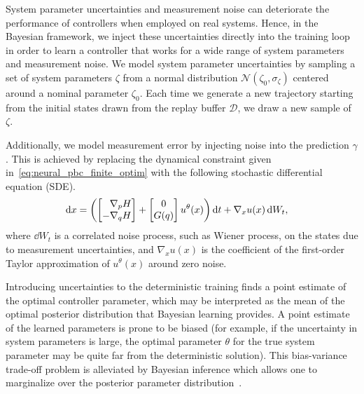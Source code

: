 

System parameter uncertainties and measurement noise can deteriorate the
performance of controllers when employed on real systems. 
%
Hence, in the Bayesian framework, we inject these uncertainties directly into
the training loop in order to learn a controller that works for a wide range of
system parameters and measurement noise.
%
We model system parameter uncertainties by sampling a set of system parameters
$\zeta$ from a normal distribution $\mathcal{N}(\zeta_0, \sigma_{\zeta})$
centered around a nominal parameter $\zeta_0$.
%
Each time we generate a new trajectory starting from the initial states drawn
from the replay buffer $\mathcal{D}$, we draw a new sample of $\zeta$.
%


Additionally, we model measurement error by injecting noise into the prediction
$\gamma$.
%
This is achieved by replacing the dynamical constraint given
in~\eqref{eq:neural_pbc_finite_optim} with the following stochastic differential
equation (SDE).
\begin{align}
    \operatorname{d}\! x &= \left(\begin{bmatrix}\phantom{-}\nabla_p H \\-\nabla_q H\end{bmatrix} + \begin{bmatrix}0 \\ G(q)\end{bmatrix}u^{\theta}(x) \right) \operatorname{d}\! t + \nabla_x u(x) \operatorname{d}\! W_t, 
    \label{eq:sde_initial}
\end{align}
where $\dd W_t$ is a correlated noise process, such as Wiener process, on the
states due to measurement uncertainties, and $\nabla_x u(x)$ is the coefficient
of the first-order Taylor approximation of $u^{\theta}(x)$ around zero noise. 

{
    \color{magenta}  
    \begin{rem}
        Introducing uncertainties to the deterministic training finds a point
        estimate of the optimal controller parameter, which may be interpreted
        as the mean of the optimal posterior distribution that Bayesian learning
        provides. A point estimate of the learned parameters is prone to be
        biased (for example, if the uncertainty in system parameters is large,
        the optimal parameter $\theta$ for the true system parameter may be
        quite far from the deterministic solution). This bias-variance trade-off
        problem is alleviated by Bayesian inference which allows one to
        marginalize over the posterior parameter
        distribution~\cite{bishop2006pattern}.
    \end{rem}  
}

